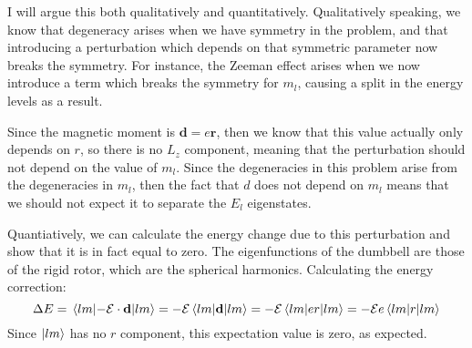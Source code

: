 \documentclass[10pt]{article}
\begin{document}
		\begin{solution}
				I will argue this both qualitatively and quantitatively. Qualitatively speaking, we know that 
				degeneracy arises when we have symmetry in the problem, and that introducing a perturbation 
				which depends on that symmetric parameter now breaks the symmetry. For instance, the Zeeman
				effect arises when we now introduce a term which breaks the symmetry for $m_l$, causing a split
				in the energy levels as a result. 

				Since the magnetic moment is $\mathbf d = e \mathbf r$, then we know that this value actually 
				only depends on $r$, so there is no $L_z$ component, meaning that the perturbation should not 
				depend on the value of $m_l$. Since the degeneracies in this problem arise from the degeneracies
				in $m_l$, then the fact that $d$ does not depend on $m_l$ means that we should not expect it to
				separate the $E_l$ eigenstates. 

				Quantiatively, we can calculate the energy change due to this perturbation and show that it 
				is in fact equal to zero. The eigenfunctions of the dumbbell are those of the rigid rotor, which
				are the spherical harmonics. Calculating the energy correction:
				\[
						\Delta E = \expval{-\mathcal E \cdot \mathbf d}{lm} = -\mathcal E \expval{\mathbf d}{lm} 
						= -\mathcal E \expval{er}{lm} = -\mathcal E e \expval{r}{lm}
				\]
				Since $\ket{lm}$ has no $r$ component, this expectation value is zero, as expected.
		\end{solution}

		\pagebreak
\end{document}
